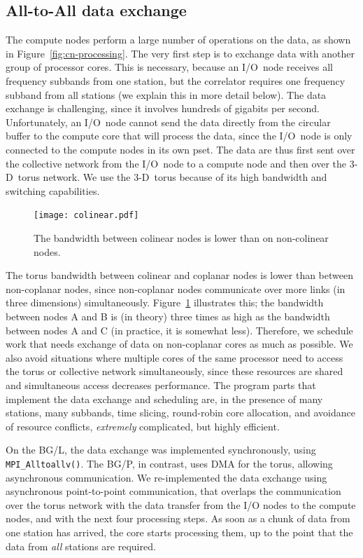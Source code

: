 \documentclass{sig-alternate}
\begin{document}
\subsection{All-to-All data exchange}

The compute nodes perform a large number of operations on the data, as shown in
Figure~\ref{fig:cn-processing}.
The very first step is to exchange data with another group of processor cores.
This is necessary, because an I/O~node receives all frequency subbands from one
station, but the correlator requires one frequency subband from all
stations (we explain this in more detail below).
The data exchange is challenging, since it involves hundreds of gigabits per
second.
Unfortunately, an I/O~node cannot send the data directly from the circular
buffer to the compute core that will process the data, since the I/O~node is
only connected to the compute nodes in its own pset.
The data are thus first sent over the collective network from the I/O~node to
a compute node and then over the 3-D~torus network.
We use the 3-D~torus because of its high bandwidth and switching capabilities.

\begin{figure}[ht]
\begin{center}
\texttt{[image: colinear.pdf]}
\end{center}
\caption{The bandwidth between colinear nodes is lower than on non-colinear nodes.}
\label{fig:colinear}
\end{figure}

The torus bandwidth between colinear and coplanar nodes is lower than between
non-coplanar nodes, since non-coplanar nodes communicate over more links
(in three dimensions) simultaneously.
Figure~\ref{fig:colinear} illustrates this; the bandwidth between nodes
\textsf{A} and \textsf{B} is (in theory) three times as high as the bandwidth
between nodes \textsf{A} and \textsf{C} (in practice, it is somewhat less).
Therefore, we schedule work that needs exchange of data 
on non-coplanar cores as much as possible.
We also avoid situations where multiple cores of the same processor need to
access the torus or collective network simultaneously, since these resources
are shared and simultaneous access decreases performance.
The program parts that implement the data exchange and scheduling are, in the
presence of many stations, many subbands, time slicing, round-robin core
allocation, and avoidance of resource conflicts, \emph{extremely\/}
complicated, but highly efficient.

On the BG/L, the data exchange was implemented synchronously, using
\texttt{MPI\_Alltoallv()}.
The BG/P, in contrast, uses DMA for the torus, allowing asynchronous
communication.
We re-implemented the data exchange using asynchronous point-to-point
communication, that overlaps the communication over the torus network with 
the data transfer from the I/O nodes to the compute nodes, and with
the next four processing steps.
As soon as a chunk of data from one station has arrived, the core starts
processing them, up to the point that the data from \emph{all\/} stations
are required.
\end{document}
